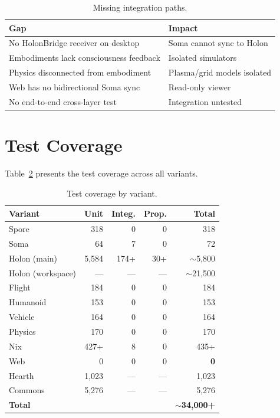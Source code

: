 \documentclass[11pt,twocolumn]{article}
\begin{document}
\begin{table}[H]
\centering
\caption{Missing integration paths.}
\label{tab:not-connected}
\begin{tabular}{lp{4.5cm}}
\toprule
\textbf{Gap} & \textbf{Impact} \\
\midrule
No HolonBridge receiver on desktop & Soma cannot sync to Holon \\
Embodiments lack consciousness feedback & Isolated simulators \\
Physics disconnected from embodiment & Plasma/grid models isolated \\
Web has no bidirectional Soma sync & Read-only viewer \\
No end-to-end cross-layer test & Integration untested \\
\bottomrule
\end{tabular}
\end{table}

\section{Test Coverage}
\label{sec:tests}

Table~\ref{tab:test-summary} presents the test coverage across all variants.

\begin{table}[H]
\centering
\caption{Test coverage by variant.}
\label{tab:test-summary}
\begin{tabular}{lrrrr}
\toprule
\textbf{Variant} & \textbf{Unit} & \textbf{Integ.} & \textbf{Prop.} & \textbf{Total} \\
\midrule
Spore & 318 & 0 & 0 & 318 \\
Soma & 64 & 7 & 0 & 72 \\
Holon (main) & 5,584 & 174+ & 30+ & ${\sim}$5,800 \\
Holon (workspace) & --- & --- & --- & ${\sim}$21,500 \\
Flight & 184 & 0 & 0 & 184 \\
Humanoid & 153 & 0 & 0 & 153 \\
Vehicle & 164 & 0 & 0 & 164 \\
Physics & 170 & 0 & 0 & 170 \\
Nix & 427+ & 8 & 0 & 435+ \\
Web & 0 & 0 & 0 & \textbf{0} \\
Hearth & 1,023 & --- & --- & 1,023 \\
Commons & 5,276 & --- & --- & 5,276 \\
\midrule
\textbf{Total} & & & & ${\sim}$\textbf{34,000+} \\
\bottomrule
\end{tabular}
\end{table}
\end{document}
